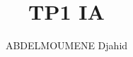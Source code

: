 \documentclass {article}
\title{TP1 IA}
\author{ABDELMOUMENE Djahid}
\begin{document}
\maketitle

\section{}
\end{document}
